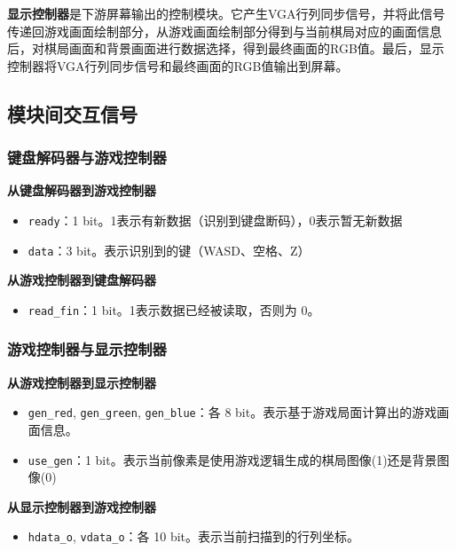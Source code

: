 \textbf{显示控制器}是下游屏幕输出的控制模块。它产生VGA行列同步信号，并将此信号传递回游戏画面绘制部分，从游戏画面绘制部分得到与当前棋局对应的画面信息后，对棋局画面和背景画面进行数据选择，得到最终画面的RGB值。最后，显示控制器将VGA行列同步信号和最终画面的RGB值输出到屏幕。

\subsection{模块间交互信号}

\subsubsection{键盘解码器与游戏控制器} \label{subsubsection:interact-input-logic}

\textbf{从键盘解码器到游戏控制器}
\begin{itemize}
    \item \texttt{ready}：1 bit。1表示有新数据（识别到键盘断码），0表示暂无新数据
    \item \texttt{data}：3 bit。表示识别到的键（WASD、空格、Z）
\end{itemize}

\textbf{从游戏控制器到键盘解码器}
\begin{itemize}
    \item \texttt{read\_fin}：1 bit。1表示数据已经被读取，否则为 0。
\end{itemize}

\subsubsection{游戏控制器与显示控制器}

\textbf{从游戏控制器到显示控制器} \label{subsubsection:interact-logic-output}
\begin{itemize}
    \item \texttt{gen\_red}, \texttt{gen\_green}, \texttt{gen\_blue}：各 8 bit。表示基于游戏局面计算出的游戏画面信息。
    \item \texttt{use\_gen}：1 bit。表示当前像素是使用游戏逻辑生成的棋局图像(1)还是背景图像(0)
\end{itemize}

\textbf{从显示控制器到游戏控制器}
\begin{itemize}
    \item \texttt{hdata\_o}, \texttt{vdata\_o}：各 10 bit。表示当前扫描到的行列坐标。
\end{itemize}


